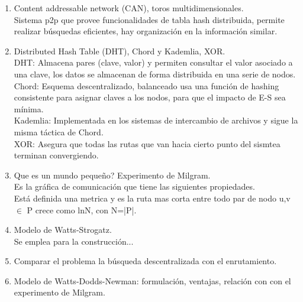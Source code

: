 \documentclass[letterpaper, 12pt]{article}
\begin{document}
\begin{enumerate}
		\item Content addressable network (CAN), toros multidimensionales.
		\\Sistema p2p que provee funcionalidades de tabla hash distribuida, permite realizar búsquedas eficientes, hay organización en la información similar.
		\item Distributed Hash Table (DHT), Chord y Kademlia, XOR.
		\\DHT: Almacena pares (clave, valor) y permiten consultar el valor asociado a una clave, los datos se almacenan de forma distribuida en una serie de nodos.
		\\Chord: Esquema descentralizado, balanceado usa una función de hashing consistente para asignar claves a los nodos, para que el impacto de E-S sea mínima.
		\\Kademlia: Implementada en los sistemas de intercambio de archivos y sigue la misma táctica de Chord.
		\\XOR: Asegura que todas las rutas que van hacia cierto punto del sismtea terminan convergiendo.
		\item Que es un mundo pequeño? Experimento de Milgram.
		\\Es la gráfica de comunicación que tiene las siguientes propiedades.
		\\Está definida una metrica y es la ruta mas corta entre todo par de nodo u,v $\in$ P crece como lnN, con N=|P|. 
		\item Modelo de Watts-Strogatz.
		\\Se emplea para la construcción... 
		\item Comparar el problema la búsqueda descentralizada con el enrutamiento.
		\item Modelo de Watts-Dodds-Newman: formulación, ventajas, relación con con el experimento de Milgram.
		
	\end{enumerate}
\end{document}
